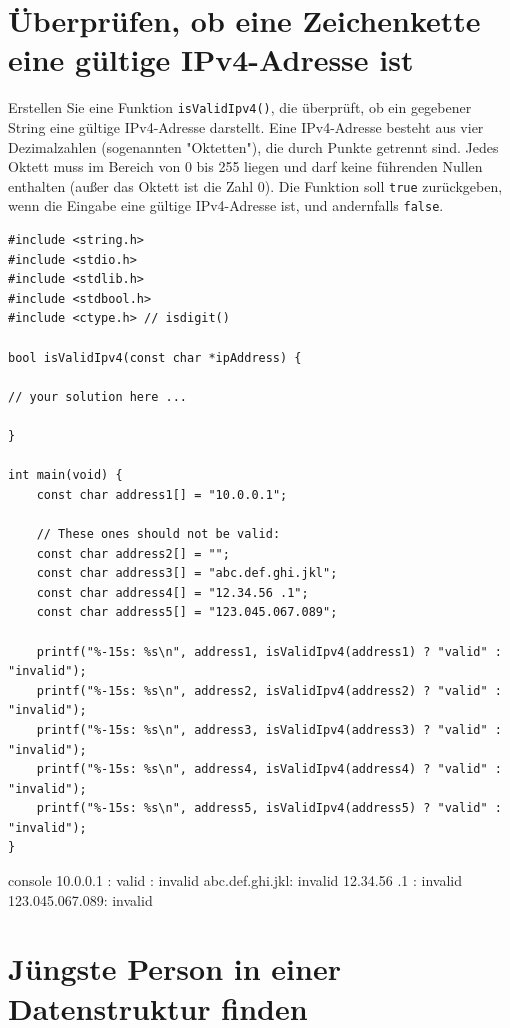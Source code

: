 \chapter{Überprüfen, ob eine Zeichenkette eine gültige IPv4-Adresse ist}

\vspace{10pt}

Erstellen Sie eine Funktion \texttt{isValidIpv4()}, die überprüft, ob ein
gegebener String eine gültige IPv4-Adresse darstellt. Eine IPv4-Adresse besteht
aus vier Dezimalzahlen (sogenannten "Oktetten"), die durch Punkte getrennt sind.
Jedes Oktett muss im Bereich von 0 bis 255 liegen und darf keine führenden
Nullen enthalten (außer das Oktett ist die Zahl 0). Die Funktion soll
\texttt{true} zurückgeben, wenn die Eingabe eine gültige IPv4-Adresse
ist, und andernfalls \texttt{false}.

\Vorlage
\begin{verbatim}
#include <string.h>
#include <stdio.h>
#include <stdlib.h>
#include <stdbool.h>
#include <ctype.h> // isdigit()

bool isValidIpv4(const char *ipAddress) {

// your solution here ...

}

int main(void) {
    const char address1[] = "10.0.0.1";

    // These ones should not be valid:
    const char address2[] = "";
    const char address3[] = "abc.def.ghi.jkl";
    const char address4[] = "12.34.56 .1";
    const char address5[] = "123.045.067.089";

    printf("%-15s: %s\n", address1, isValidIpv4(address1) ? "valid" : "invalid");
    printf("%-15s: %s\n", address2, isValidIpv4(address2) ? "valid" : "invalid");
    printf("%-15s: %s\n", address3, isValidIpv4(address3) ? "valid" : "invalid");
    printf("%-15s: %s\n", address4, isValidIpv4(address4) ? "valid" : "invalid");
    printf("%-15s: %s\n", address5, isValidIpv4(address5) ? "valid" : "invalid");
}

\end{verbatim}

\begin{mybox}[title=Bildschirmausgabe]{console}
10.0.0.1       : valid
               : invalid
abc.def.ghi.jkl: invalid
12.34.56 .1    : invalid
123.045.067.089: invalid
\end{mybox}




\chapter{Jüngste Person in einer Datenstruktur finden}

